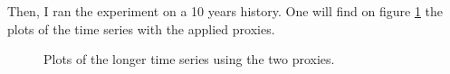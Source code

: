 \documentclass[11pt,a4paper,oneside]{book}
\begin{document}
Then, I ran the experiment on a 10 years history. One will find on figure \ref{fig:plot10y} the plots of the time series with the applied proxies.


\begin{figure}[!h]
\centering
{}
\caption{Plots of the longer time series using the two proxies.}
\label{fig:plot10y}
\end{figure}
\end{document}
